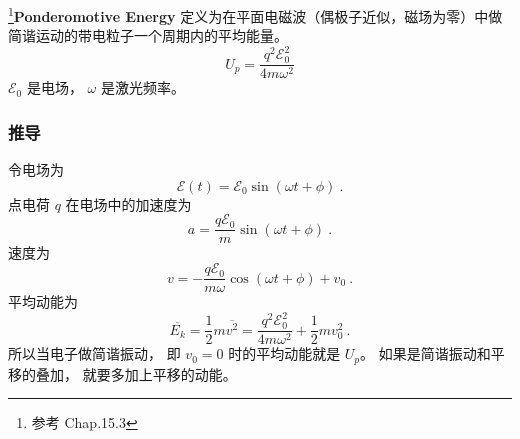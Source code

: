 

\footnote{参考 \cite{Bransden} Chap.15.3}\textbf{Ponderomotive Energy} 定义为在平面电磁波（偶极子近似，磁场为零）中做简谐运动的带电粒子一个周期内的平均能量。
\begin{equation}\label{eq_Ponder_1}
U_p = \frac{q^2 \mathcal E_0^2}{4m\omega^2}
\end{equation}
$\mathcal E_0$ 是电场， $\omega$ 是激光频率。

\subsubsection{推导}
令电场为
\begin{equation}
\mathcal E(t) = \mathcal E_0 \sin(\omega t + \phi)~.
\end{equation}
点电荷 $q$ 在电场中的加速度为
\begin{equation}
a = \frac{q\mathcal E_0}{m} \sin(\omega t + \phi)~.
\end{equation}
速度为
\begin{equation}
v = -\frac{q\mathcal E_0}{m\omega} \cos(\omega t + \phi) + v_0~.
\end{equation}
平均动能为
\begin{equation}
\overline{E_k} = \frac{1}{2}m \overline{v^2} = \frac{q^2\mathcal E_0^2}{4m\omega^2} + \frac{1}{2}mv_0^2~.
\end{equation}
所以当电子做简谐振动， 即 $v_0 = 0$ 时的平均动能就是 $U_p$。 如果是简谐振动和平移的叠加， 就要多加上平移的动能。
